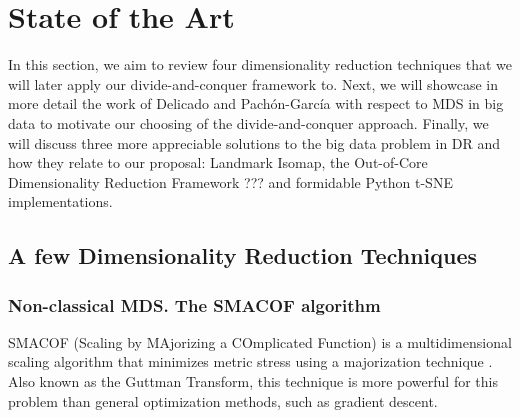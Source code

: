 \section{State of the Art}

In this section, we aim to review four dimensionality reduction techniques that we will later apply our divide-and-conquer framework to. Next, we will showcase in more detail the work of Delicado and Pachón-García with respect to MDS in big data \cite{Delicado2024a} to motivate our choosing of the divide-and-conquer approach. Finally, we will discuss three more appreciable solutions to the big data problem in DR and how they relate to our proposal: Landmark Isomap, the Out-of-Core Dimensionality Reduction Framework ??? and formidable Python t-SNE implementations.

\subsection{A few Dimensionality Reduction Techniques}

\subsubsection{Non-classical MDS. The SMACOF algorithm}

SMACOF (Scaling by MAjorizing a COmplicated Function) is a multidimensional scaling algorithm that minimizes metric stress using a majorization technique \cite{borg1997modern}. Also known as the Guttman Transform, this technique is more powerful for this problem than general optimization methods, such as gradient descent.

